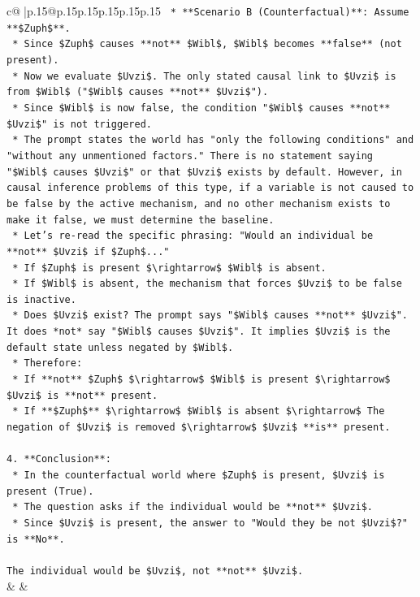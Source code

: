 \documentclass{article}
\begin{document}
{\begin{supertabular}{c@{$\;$}|p{.15\linewidth}@{}p{.15\linewidth}p{.15\linewidth}p{.15\linewidth}p{.15\linewidth}p{.15\linewidth}}
{{{\texttt{    *   **Scenario B (Counterfactual)**: Assume **\$Zuph\$**.} \\
\texttt{        *   Since \$Zuph\$ causes **not** \$Wibl\$, \$Wibl\$ becomes **false** (not present).} \\
\texttt{        *   Now we evaluate \$Uvzi\$. The only stated causal link to \$Uvzi\$ is from \$Wibl\$ ("\$Wibl\$ causes **not** \$Uvzi\$").} \\
\texttt{        *   Since \$Wibl\$ is now false, the condition "\$Wibl\$ causes **not** \$Uvzi\$" is not triggered.} \\
\texttt{        *   The prompt states the world has "only the following conditions" and "without any unmentioned factors." There is no statement saying "\$Wibl\$ causes \$Uvzi\$" or that \$Uvzi\$ exists by default. However, in causal inference problems of this type, if a variable is not caused to be false by the active mechanism, and no other mechanism exists to make it false, we must determine the baseline.} \\
\texttt{        *   Let's re{-}read the specific phrasing: "Would an individual be **not** \$Uvzi\$ if \$Zuph\$..."} \\
\texttt{        *   If \$Zuph\$ is present \$\textbackslash{}rightarrow\$ \$Wibl\$ is absent.} \\
\texttt{        *   If \$Wibl\$ is absent, the mechanism that forces \$Uvzi\$ to be false is inactive.} \\
\texttt{        *   Does \$Uvzi\$ exist? The prompt says "\$Wibl\$ causes **not** \$Uvzi\$". It does *not* say "\$Wibl\$ causes \$Uvzi\$". It implies \$Uvzi\$ is the default state unless negated by \$Wibl\$.} \\
\texttt{        *   Therefore:} \\
\texttt{            *   If **not** \$Zuph\$ \$\textbackslash{}rightarrow\$ \$Wibl\$ is present \$\textbackslash{}rightarrow\$ \$Uvzi\$ is **not** present.} \\
\texttt{            *   If **\$Zuph\$** \$\textbackslash{}rightarrow\$ \$Wibl\$ is absent \$\textbackslash{}rightarrow\$ The negation of \$Uvzi\$ is removed \$\textbackslash{}rightarrow\$ \$Uvzi\$ **is** present.} \\
\\ 
\texttt{4.  **Conclusion**:} \\
\texttt{    *   In the counterfactual world where \$Zuph\$ is present, \$Uvzi\$ is present (True).} \\
\texttt{    *   The question asks if the individual would be **not** \$Uvzi\$.} \\
\texttt{    *   Since \$Uvzi\$ is present, the answer to "Would they be not \$Uvzi\$?" is **No**.} \\
\\ 
\texttt{The individual would be \$Uvzi\$, not **not** \$Uvzi\$.} \\
            }
        }
    }
    & & \\ \\


\end{supertabular}}
\end{document}
